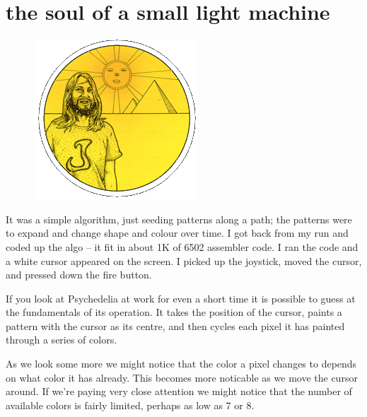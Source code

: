\chapter{the soul of a small light machine} 
\label{sec:listing_pattern}
\lstset{style=6502Style}
\begin{definition}
\setlength{\intextsep}{0pt}%
\setlength{\columnsep}{3pt}%
\begin{figure}
\includegraphics[width=\linewidth]{src/callout/psych.png} 
\end{figure}
\small
It was a simple algorithm, just seeding patterns along a path; the patterns
  were to expand and change shape and colour over time. I got back from my run
  and coded up the algo – it fit in about 1K of 6502 assembler code. I ran the
  code and a white cursor appeared on the screen. I picked up the joystick,
  moved the cursor, and pressed down the fire button.
\end{definition}

If you look at Psychedelia at work for even a short time it is possible to guess at the fundamentals
of its operation. It takes the position of the cursor, paints a pattern with the cursor as its centre,
and then cycles each pixel it has painted through a series of colors.

As we look some more we might notice that the color a pixel changes to depends on what color it has already.
This becomes more noticable as we move the cursor around. If we're paying very close attention we might notice
that the number of available colors is fairly limited, perhaps as low as 7 or 8.

